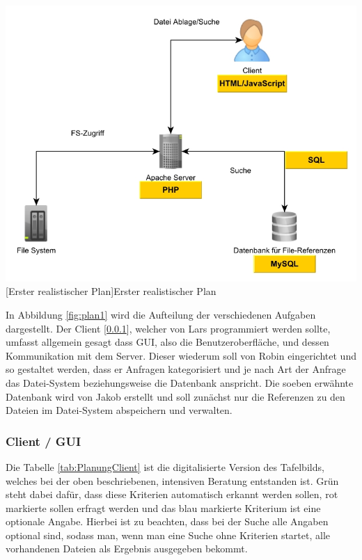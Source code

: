 \documentclass[12pt,a4paper,bibliography=totocnumbered,listof=totocnumbered]{scrartcl}
\begin{document}
\vspace{1em}
\begin{minipage}{\linewidth}
	\centering
	\includegraphics[width=0.7\linewidth]{Bilder/Projekt-Entwurf.jpg}
	[Erster realistischer Plan]{Erster realistischer Plan}
	\label{fig:plan1}
\end{minipage}
\vspace{1em}

In Abbildung \ref{fig:plan1} wird die Aufteilung der verschiedenen Aufgaben dargestellt. Der Client [\ref{sec:Client / GUI}], welcher von Lars programmiert werden sollte, umfasst allgemein gesagt dass GUI, also die Benutzeroberfläche, und dessen Kommunikation mit dem Server. Dieser wiederum soll von Robin eingerichtet und so gestaltet werden, dass er Anfragen kategorisiert und je nach Art der Anfrage das Datei-System beziehungsweise die Datenbank anspricht. Die soeben erwähnte Datenbank wird von Jakob erstellt und soll zunächst nur die Referenzen zu den Dateien im Datei-System abspeichern und verwalten.\\

\subsubsection{Client / GUI}
\label{sec:Client / GUI}

Die Tabelle \ref{tab:PlanungClient} ist die digitalisierte Version des Tafelbilds, welches bei der oben beschriebenen, intensiven Beratung entstanden ist. Grün steht dabei dafür, dass diese Kriterien automatisch erkannt werden sollen, rot markierte sollen erfragt werden und das blau markierte Kriterium ist eine optionale Angabe. Hierbei ist zu beachten, dass bei der Suche alle Angaben optional sind, sodass man, wenn man eine Suche ohne Kriterien startet, alle vorhandenen Dateien als Ergebnis ausgegeben bekommt.
\end{document}
